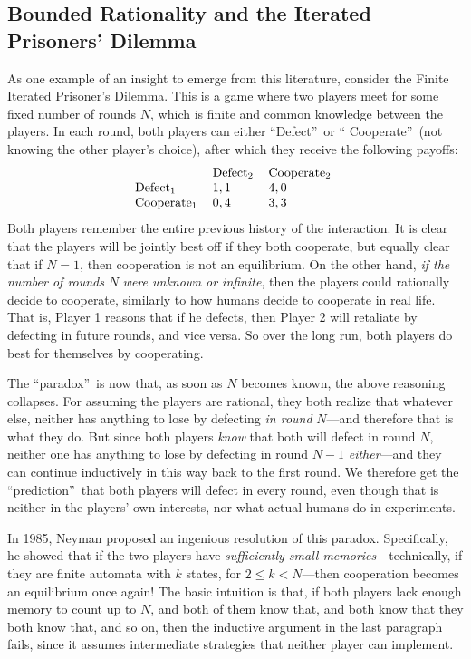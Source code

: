 \documentclass[12pt,onecolumn]{article}%
\begin{document}
\subsection{Bounded Rationality and the Iterated Prisoners' Dilemma\label{IPD}%
}

As one example of an insight to emerge from this literature, consider the
Finite Iterated Prisoner's Dilemma. This is a game where two players meet
for some fixed number of rounds $N$, which is finite and common knowledge
between the players. In each round, both players can either
\textquotedblleft Defect\textquotedblright\  or \textquotedblleft
Cooperate\textquotedblright\  (not knowing the other player's choice), after
which they receive the following payoffs:%
\[%
\begin{tabular}
[c]{lll}
& Defect$_{2}$ & Cooperate$_{2}$\\
Defect$_{1}$ & $1,1$ & $4,0$\\
Cooperate$_{1}$ & $0,4$ & $3,3$%
\end{tabular}
 \
\]
Both players remember the entire previous history of the interaction. It is
clear that the players will be jointly best off if they both cooperate, but
equally clear that if $N=1$, then cooperation is not an equilibrium. On the
other hand, \textit{if the number of rounds }$N$\textit{ were unknown or
infinite}, then the players could rationally decide to cooperate, similarly to
how humans decide to cooperate in real life. That is, Player 1 reasons that
if he defects, then Player 2 will retaliate by defecting in future rounds, and
vice versa. So over the long run, both players do best for themselves by cooperating.

The \textquotedblleft paradox\textquotedblright\  is now that, as soon as $N$
becomes known, the above reasoning collapses. For assuming the players are
rational, they both realize that whatever else, neither has anything to lose
by defecting \textit{in round} $N$---and therefore that is what they do. But
since both players \textit{know} that both will defect in round $N$, neither
one has anything to lose by defecting in round $N-1$ \textit{either}---and
they can continue inductively in this way back to the first round. We
therefore get the \textquotedblleft prediction\textquotedblright\  that both
players will defect in every round, even though that is neither in the
players' own interests, nor what actual humans do in experiments.

In 1985, Neyman \cite{neyman} proposed an ingenious resolution of this
paradox. Specifically, he showed that if the two players have
\textit{sufficiently small memories}---technically, if they are finite
automata with $k$ states, for $2\leq k<N$---then cooperation becomes an
equilibrium once again! The basic intuition is that, if both players lack
enough memory to count up to $N$, and both of them know that, and both know
that they both know that, and so on, then the inductive argument in the last
paragraph fails, since it assumes intermediate strategies that neither player
can implement.
\end{document}
